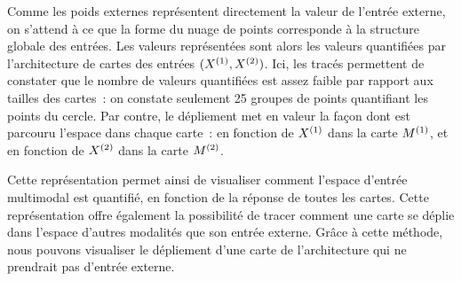 \documentclass[../main]{subfiles}
\begin{document}
Comme les poids externes représentent directement la valeur de l'entrée externe, on s'attend à ce que la forme du nuage de points corresponde à la structure globale des entrées. Les valeurs représentées sont alors les valeurs quantifiées par l'architecture de cartes des entrées $(X^{({1})}, X^{({2})})$.
Ici, les tracés permettent de constater que le nombre de valeurs quantifiées est assez faible par rapport aux tailles des cartes~: on constate seulement 25 groupes de points quantifiant les points du cercle.
Par contre, le dépliement met en valeur la façon dont est parcouru l'espace dans chaque carte~: en fonction de $X^{({1})}$ dans la carte $M^{({1})}$, et en fonction de $X^{({2})}$ dans la carte $M^{({2})}$.

Cette représentation permet ainsi de visualiser comment l'espace d'entrée multimodal est quantifié, en fonction de la réponse de toutes les cartes.
Cette représentation offre également la possibilité de tracer comment une carte se déplie dans l'espace d'autres modalités que son entrée externe. 
Grâce à cette méthode, nous pouvons visualiser le dépliement d'une carte de l'architecture qui ne prendrait pas d'entrée externe.
\end{document}
